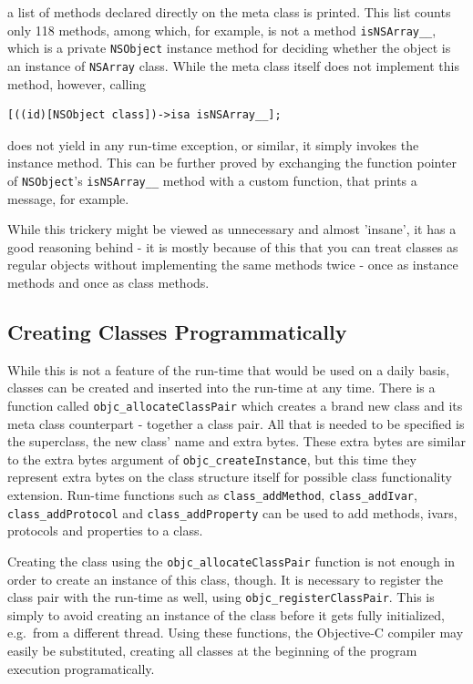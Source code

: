 a list of methods declared directly on the meta class is printed. This list counts only 118 methods, among which, for example, is not a method \verb=isNSArray__=, which is a private \verb=NSObject= instance method for deciding whether the object is an instance of \verb=NSArray= class. While the meta class itself does not implement this method, however, calling

\begin{verbatim}
[((id)[NSObject class])->isa isNSArray__];
\end{verbatim}

does not yield in any run-time exception, or similar, it simply invokes the instance method. This can be further proved by exchanging the function pointer of \verb=NSObject='s \verb=isNSArray__= method with a custom function, that prints a message, for example.

While this trickery might be viewed as unnecessary and almost 'insane', it has a good reasoning behind - it is mostly because of this that you can treat classes as regular objects without implementing the same methods twice - once as instance methods and once as class methods.

\subsection{Creating Classes Programmatically}

While this is not a feature of the run-time that would be used on a daily basis, classes can be created and inserted into the run-time at any time. There is a function called \verb=objc_allocateClassPair= which creates a brand new class and its meta class counterpart - together a class pair. All that is needed to be specified is the superclass, the new class' name and extra bytes. These extra bytes are similar to the extra bytes argument of \verb=objc_createInstance=, but this time they represent extra bytes on the class structure itself for possible class functionality extension. Run-time functions such as \verb=class_addMethod=, \verb=class_addIvar=, \verb=class_addProtocol= and \verb=class_addProperty= can be used to add methods, ivars, protocols and properties to a class.

Creating the class using the \verb=objc_allocateClassPair= function is not enough in order to create an instance of this class, though. It is necessary to register the class pair with the run-time as well, using \verb=objc_registerClassPair=. This is simply to avoid creating an instance of the class before it gets fully initialized, e.g.\ from a different thread. Using these functions, the Objective-C compiler may easily be substituted, creating all classes at the beginning of the program execution programatically.


